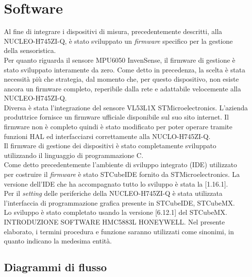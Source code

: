 \chapter{Software}
Al fine di integrare i dispositivi di misura, precedentemente descritti, alla NUCLEO-H745ZI-Q, è stato sviluppato un \textit{firmware} specifico per la gestione della sensoristica.\\
Per quanto riguarda il sensore MPU6050 InvenSense, il firmware di gestione è stato sviluppato interamente da zero. Come detto in precedenza, la scelta è stata necessità più che strategia, dal momento che, per questo dispositivo, non esiste ancora un firmware completo, reperibile dalla rete e adattabile velocemente alla NUCLEO-H745ZI-Q.\\
Diversa è stata l'integrazione del sensore VL53L1X STMicroelectronics. L'azienda produttrice fornisce un firmware ufficiale disponibile sul suo sito internet. Il firmware non è completo quindi è stato modificato per poter operare tramite funzioni HAL ed interfacciarsi correttamente alla NUCLO-H745ZI-Q.\\
Il firmware di gestione dei dispositivi è stato completamente sviluppato utilizzando il linguaggio di programmazione C.\\
Come detto precedentemente l'ambiente di sviluppo integrato (IDE) utilizzato per costruire il \textit{firmware} è stato STCubeIDE fornito da STMicroelectronics. La versione dell'IDE che ha accompagnato tutto lo sviluppo è stata la [1.16.1].\\
Per il \textit{setting} delle periferiche della NUCLEO-H745ZI-Q è stata utilizzata l'interfaccia di programmazione grafica presente in STCubeIDE, STCubeMX.\\
Lo sviluppo è stato completato usando la versione [6.12.1] del STCubeMX.\\
INTRODUZIONE SOFTWARE HMC5883L HONEYWELL.
Nel presente elaborato, i termini procedura e funzione saranno utilizzati come sinonimi, in quanto indicano la medesima entità.
\section{Diagrammi di flusso}
